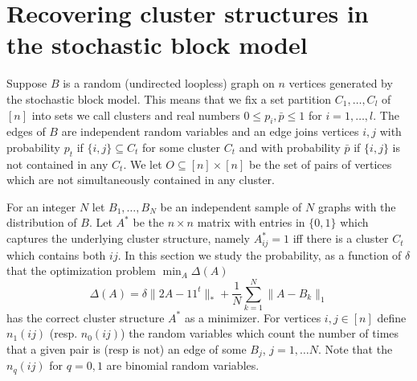 \documentclass[12pt]{amsart}
\numberwithin{equation}{section}
\begin{document}
\newpage



\section{Recovering cluster structures in the stochastic block model}

Suppose $B$ is a random (undirected loopless) graph on $n$ vertices generated by the stochastic block model. This means that we fix a set partition $C_1,\dots, C_l$ of $[n]$ into sets we call clusters and real numbers $0\leq p_i,\bar{p}\leq 1$ for $i=1,\dots, l$. The edges of $B$ are independent random variables and an edge joins vertices $i,j$ with probability $p_t$ if $\{i,j\}\subseteq C_t$ for some cluster $C_t$ and with probability $\bar{p}$ if $\{i,j\}$ is not contained in any $C_t$. We let $O\subseteq [n]\times [n]$ be the set of pairs of vertices which are not simultaneously contained in any cluster. 

For an integer $N$ let $B_1,\dots, B_N$ be an independent sample of $N$ graphs with the distribution of $B$. Let $A^*$ be the $n\times n$ matrix with entries in $\{0,1\}$ which captures the underlying cluster structure, namely $A^*_{ij}=1$ iff there is a cluster $C_t$ which contains both $ij$. In this section we study the probability, as a function of $\delta$ that the optimization problem $\min_A\Delta(A)$
\[\Delta(A)= \delta\|2A-11^t\|_{*}+\frac{1}{N}\sum_{k=1}^N\|A-B_k\|_1\] 
has the correct cluster structure $A^*$ as a minimizer. For vertices $i,j\in [n]$ define $n_1(ij)$ (resp. $n_0(ij)$) the random variables which count the number of times that a given pair is (resp is not) an edge of some $B_j$, $j=1,\dots N$. Note that the $n_q(ij)$ for $q=0,1$ are binomial random variables.  
\end{document}
